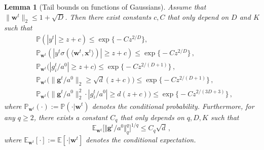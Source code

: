 \documentclass[11pt]{article}
\renewcommand{\P}{\mathbb{P}}
\newcommand{\E}{\mathbb{E}}
\newcommand{\<}{\langle}
\renewcommand{\>}{\rangle}
\newtheorem{lemma}{Lemma}
\theoremstyle{definition}
\def\bg{{\boldsymbol g}}
\def\bw{{\boldsymbol w}}
\def\bx{{\boldsymbol x}}
\def\bg{{\boldsymbol g}}
\def\bw{{\boldsymbol w}}
\def\bx{{\boldsymbol x}}
\def\bg{{\boldsymbol g}}
\def\bg{{\boldsymbol g}}
\begin{document}
\begin{lemma}[Tail bounds on functions of Gaussians]\label{lem:bounds_gradient}
Assume that $\| \bw^t \|_2 \leq 1 + \sqrt{D}$. Then there exist constants $c,C$ that only depend on $D$ and $K$ such that
\begin{equation}\label{eq:tail_bounds_fct_gaussian}
\begin{aligned}
&\P(|y^t | \geq z + c) \leq \exp\big\{-Cz^{2/D}\big\}, \\
&\P_{\bw^t} \left( |y^t \sigma ( \< \bw^t , \bx^t \>) | \geq z + c \right) \leq \exp \big\{ - C z^{2/D} \big\} \, , \\
&\P_{\bw^t} \big( |g_i^t/a^0| \geq z + c\big) \leq \exp \big\{ - C z^{2/(D+1)} \big\}  \, , \\ 
&\P_{\bw^t} \big( \| \bg^t /a^0\|_2 \geq \sqrt{d} (z + c )   \big)\leq  \exp \big\{ - C z^{2/(D+1)} \big\}  \, , \\
& \P_{\bw^t} \big( \| \bg^t /a^0\|_2^2 \cdot | g_i^t /a^0 | \geq d (z + c )  \big) \leq   \exp \big\{ - C z^{2/(3D+3)} \big\}  \, ,
\end{aligned}
\end{equation}
where $\P_{\bw^t} (\cdot) := \P (\cdot | \bw^t)$ denotes the conditional probability. Furthermore, for any $q \geq 2$, there exists a constant $C_q$ that only depends on $q,D,K$ such that
\begin{equation}
    \E_{\bw^t} \Big[ \big\Vert \bg^t/a^0 \big\Vert_q^q \Big]^{1/q} \leq C_q \sqrt{d} \, ,
\end{equation}
where $\E_{\bw^t} [\cdot] := \E [ \cdot | \bw^t ]$ denotes the conditional expectation.
\end{lemma}
\end{document}
